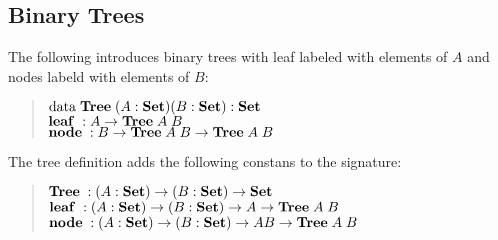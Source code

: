 \subsection{Binary Trees}
The following introduces binary trees with leaf labeled with elements of $A$ and nodes labeld with elements of $B$:
\begin{quote}
$\mathrm{data}\; \mathbf{Tree}\; ( A : \mathbf{Set} ) ( B : \mathbf{Set} ) : \mathbf{Set} $ 
\\
$\mathbf{leaf}\; : A \rightarrow \mathbf{Tree}\; A \; B $
\\
$\mathbf{node}\; : B \rightarrow \mathbf{Tree}\; A \; B \rightarrow \mathbf{Tree}\; A \; B $
\end{quote}
The tree definition adds the following constans to the signature:
\begin{quote}
$\mathbf{Tree}\;  : ( A : \mathbf{Set} ) \rightarrow ( B : \mathbf{Set} ) \rightarrow \mathbf{Set}$
\\
$\mathbf{leaf}\; : ( A : \mathbf{Set} ) \rightarrow ( B : \mathbf{Set} ) \rightarrow A \rightarrow \mathbf{Tree}\; A \; B $
\\
$\mathbf{node}\; : ( A : \mathbf{Set} ) \rightarrow ( B : \mathbf{Set} ) \rightarrow A B \rightarrow \mathbf{Tree}\; A \; B $
\end{quote}
